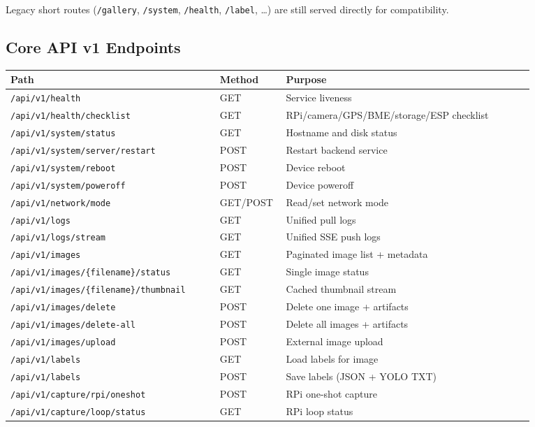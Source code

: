 Legacy short routes (\texttt{/gallery}, \texttt{/system}, \texttt{/health}, \texttt{/label}, \dots) are still served directly for compatibility.

\subsection{Core API v1 Endpoints}
\begin{longtable}{p{0.38\linewidth} p{0.12\linewidth} p{0.45\linewidth}}
\toprule
Path & Method & Purpose \\
\midrule
\texttt{/api/v1/health} & GET & Service liveness \\
\texttt{/api/v1/health/checklist} & GET & RPi/camera/GPS/BME/storage/ESP checklist \\
\texttt{/api/v1/system/status} & GET & Hostname and disk status \\
\texttt{/api/v1/system/server/restart} & POST & Restart backend service \\
\texttt{/api/v1/system/reboot} & POST & Device reboot \\
\texttt{/api/v1/system/poweroff} & POST & Device poweroff \\
\texttt{/api/v1/network/mode} & GET/POST & Read/set network mode \\
\texttt{/api/v1/logs} & GET & Unified pull logs \\
\texttt{/api/v1/logs/stream} & GET & Unified SSE push logs \\
\texttt{/api/v1/images} & GET & Paginated image list + metadata \\
\texttt{/api/v1/images/\{filename\}/status} & GET & Single image status \\
\texttt{/api/v1/images/\{filename\}/thumbnail} & GET & Cached thumbnail stream \\
\texttt{/api/v1/images/delete} & POST & Delete one image + artifacts \\
\texttt{/api/v1/images/delete-all} & POST & Delete all images + artifacts \\
\texttt{/api/v1/images/upload} & POST & External image upload \\
\texttt{/api/v1/labels} & GET & Load labels for image \\
\texttt{/api/v1/labels} & POST & Save labels (JSON + YOLO TXT) \\
\texttt{/api/v1/capture/rpi/oneshot} & POST & RPi one-shot capture \\
\texttt{/api/v1/capture/loop/status} & GET & RPi loop status \\

\end{longtable}
